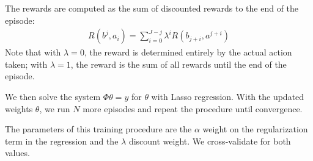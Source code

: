 The rewards are computed as the sum of discounted rewards to the end of the episode:
\begin{align}
R(b^j,a_i) = \sum_{i=0}^{J-j} \lambda^i R(b_{j+i},a^{j+i})
\end{align}
Note that with $\lambda=0$, the reward is determined entirely by the actual action taken; with $\lambda=1$, the reward is the sum of all rewards until the end of the episode.

We then solve the system $\Phi \theta = y$ for $\theta$ with Lasso regression.
With the updated weights $\theta$, we run $N$ more episodes and repeat the procedure until convergence.

The parameters of this training procedure are the $\alpha$ weight on the regularization term in the regression and the $\lambda$ discount weight.
We cross-validate for both values.

